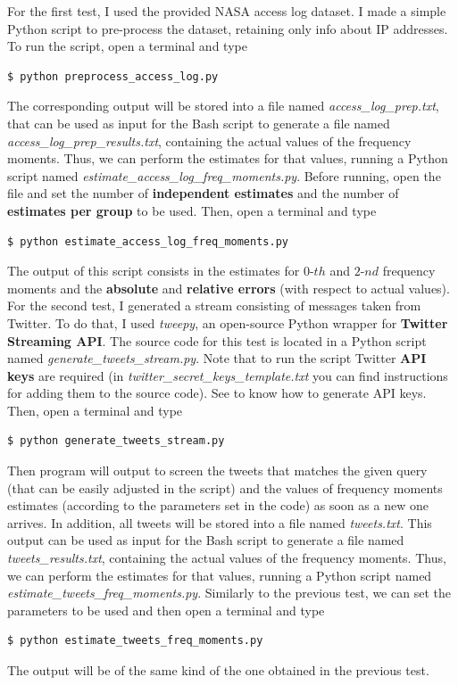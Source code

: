 \noindent For the first test, I used the provided NASA access log dataset\cite{nasa}. I made a simple Python script to pre-process the dataset, retaining only info about IP addresses. To run the script, open a terminal and type
\begin{lstlisting}
$ python preprocess_access_log.py
\end{lstlisting}
The corresponding output will be stored into a file named \textit{access\_log\_prep.txt}, that can be used as input for the Bash script to generate a file named \textit{access\_log\_prep\_results.txt}, containing the actual values of the frequency moments.
Thus, we can perform the estimates for that values, running a Python script named \textit{estimate\_access\_log\_freq\_moments.py}. Before running, open the file and set the number of \textbf{independent estimates} and the number of \textbf{estimates per group} to be used. Then, open a terminal and type
\begin{lstlisting}
$ python estimate_access_log_freq_moments.py
\end{lstlisting}
The output of this script consists in the estimates for $0\text{-}th$ and $2\text{-}nd$ frequency moments and the \textbf{absolute} and \textbf{relative errors} (with respect to actual values).\\

\noindent For the second test, I generated a stream consisting of messages taken from Twitter. To do that, I used \textit{tweepy}\cite{tweepy}, an open-source Python wrapper for \textbf{Twitter Streaming API}\cite{twitter}. The source code for this test is located in a Python script named \textit{generate\_tweets\_stream.py}. Note that to run the script Twitter \textbf{API keys} are required (in \textit{twitter\_secret\_keys\_template.txt} you can find instructions for adding them to the source code). See \cite{twitter} to know how to generate API keys. Then, open a terminal and type
\begin{lstlisting}
$ python generate_tweets_stream.py
\end{lstlisting}
Then program will output to screen the tweets that matches the given query (that can be easily adjusted in the script) and the values of frequency moments estimates (according to the parameters set in the code) as soon as a new one arrives.
In addition, all tweets will be stored into a file named \textit{tweets.txt}. This output can be used as input for the Bash script to generate a file named \textit{tweets\_results.txt}, containing the actual values of the frequency moments.
Thus, we can perform the estimates for that values, running a Python script named \textit{estimate\_tweets\_freq\_moments.py}. Similarly to the previous test, we can set the parameters to be used and then open a terminal and type
\begin{lstlisting}
$ python estimate_tweets_freq_moments.py
\end{lstlisting}
The output will be of the same kind of the one obtained in the previous test.


